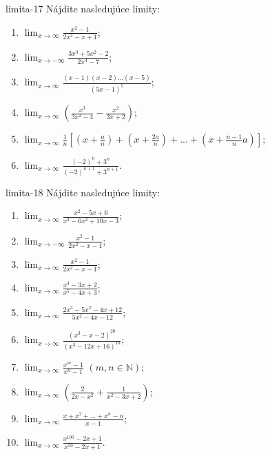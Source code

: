 \begin{defproblem}{limita-17}
Nájdite nasledujúce limity:

\begin{multicols}{2}
\begin{enumerate}
    \item $\lim_{{x \rightarrow \infty}} \frac{x^2-1}{2x^2-x+1}$;
    \item $\lim_{{x \rightarrow -\infty}} \frac{3x^3+5x^2-2}{2x^4-7}$;
    \item $\lim_{{x \rightarrow \infty}} \frac{(x-1)(x-2)...(x-5)}{(5x-1)^5}$;
    \item $\lim_{{x \rightarrow \infty}} (\frac{x^3}{3x^2-4}-\frac{x^2}{3x+2})$;
    \item $\lim_{{x \rightarrow \infty}} \frac{1}{n}[(x+\frac{a}{n})+(x+\frac{2a}{n})+...+(x+\frac{n-1}{n}a)]$;
    \item $\lim_{{x \rightarrow \infty}} \frac{(-2)^n+3^n}{(-2)^{n+1}+3^{n+1}}$.
\end{enumerate}
\end{multicols}
\end{defproblem}

\begin{defproblem}{limita-18}
Nájdite nasledujúce limity:

\begin{multicols}{2}
\begin{enumerate}
    \item $\lim_{{x \rightarrow \infty}} \frac{x^2-5x+6}{x^3-6x^2+10x-3}$;
    \item $\lim_{{x \rightarrow -\infty}} \frac{x^2-1}{2x^2-x-1}$;
    \item $\lim_{{x \rightarrow \infty}} \frac{x^2-1}{2x^2-x-1}$;
    \item $\lim_{{x \rightarrow \infty}} \frac{x^4-3x+2}{x^5-4x+3}$;
    \item $\lim_{{x \rightarrow \infty}} \frac{2x^3-5x^2-4x+12}{5x^2-4x-12}$;
    \item $\lim_{{x \rightarrow \infty}} \frac{(x^3-x-2)^{20}}{(x^3-12x+16)^{10}}$;
    \item $\lim_{{x \rightarrow \infty}} \frac{x^m-1}{x^n-1}$ $(m,n \in \mathbb{N})$;
    \item $\lim_{{x \rightarrow \infty}} (\frac{2}{2x-x^2}+\frac{1}{x^2-3x+2})$;
    \item $\lim_{{x \rightarrow \infty}} \frac{x+x^2+...+x^n-n}{x-1}$;
    \item $\lim_{{x \rightarrow \infty}} \frac{x^{100}-2x+1}{x^{50}-2x+1}$.
\end{enumerate}
\end{multicols}
\end{defproblem}

